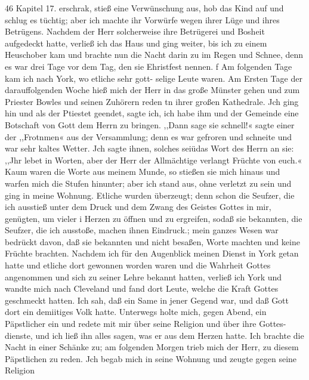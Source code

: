 46 Kapitel 17.
erschrak, stieß eine Verwünschung aus, hob das Kind auf und
schlug es tüchtig; aber ich machte ihr Vorwürfe wegen ihrer
Lüge und ihres Betrügens. Nachdem der Herr solcherweise ihre
Betrügerei und Bosheit aufgedeckt hatte, verließ ich das Haus
und ging weiter, bis ich zu einem Heuschober kam und brachte
nun die Nacht darin zu im Regen und Schnee, denn es war
drei Tage vor dem Tag, den sie Ehristfest nennen.
f Am folgenden Tage kam ich nach York, wo etliche sehr gott-
selige Leute waren. Am Ersten Tage der darauffolgenden
Woche hieß mich der Herr in das große Münster gehen und zum
Priester Bowles und seinen Zuhörern reden tn ihrer großen
Kathedrale. Jch ging hin und als der Ptiestet geendet, sagte ich,
ich habe ihm und der Gemeinde eine Botschaft von Gott dem
Herrn zu bringen. ,,Dann sage sie schnell!« sagte einer der
,,Frotnmen« aus der Versammlung; denn es war gefroren und
schneite und war sehr kaltes Wetter. Jch sagte ihnen, solches
seiüdas Wort des Herrn an sie: ,,Jhr lebet in Worten, aber der
Herr der Allmächtige verlangt Früchte von euch.« Kaum waren
die Worte aus meinem Munde, so stießen sie mich hinaus und
warfen mich die Stufen hinunter; aber ich stand aus, ohne verletzt
zu sein und ging in meine Wohnung. Etliche wurden überzeugt;
denn schon die Seufzer, die ich ausstieß unter dem Druck und
dem Zwang des Geistes Gottes in mir, genügten, um vieler
i Herzen zu öffnen und zu ergreifen, sodaß sie bekannten, die Seufzer,
die ich ausstoße, machen ihnen Eindruck.; mein ganzes Wesen
war bedrückt davon, daß sie bekannten und nicht besaßen, Worte
machten und keine Früchte brachten.
Nachdem ich für den Augenblick meinen Dienst in York getan
hatte und etliche dort gewonnen worden waren und die Wahrheit
Gottes angenommen und sich zu seiner Lehre bekannt hatten,
verließ ich York und wandte mich nach Cleveland und fand dort
Leute, welche die Kraft Gottes geschmeckt hatten. Ich sah, daß
ein Same in jener Gegend war, und daß Gott dort ein demiitiges
Volk hatte. Unterwegs holte mich, gegen Abend, ein Päpstlicher
ein und redete mit mir über seine Religion und über ihre Gottes-
dienste, und ich ließ ihn alles sagen, was er aus dem Herzen
hatte. Ich brachte die Nacht in einer Schänke zu; am folgenden
Morgen trieb mich der Herr, zu diesem Päpstlichen zu reden. Jch
begab mich in seine Wohnung und zeugte gegen seine Religion


